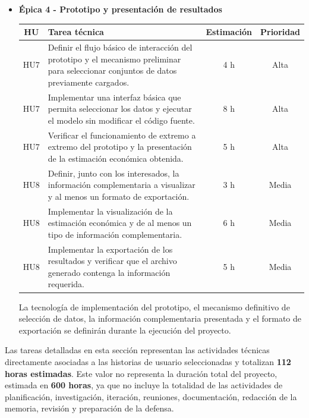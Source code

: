 \documentclass[
11pt, %
]{charter}
\begin{document}
\begin{itemize}
  Los algoritmos concretos, las métricas, la estrategia de validación y las técnicas utilizadas para analizar la relevancia de las variables se definirán y ajustarán durante la ejecución del proyecto en función de las características de los datos y del modelo desarrollado.


  \item \textbf{\'{E}pica 4 - Prototipo y presentación de resultados}

  \begin{center}
  \begin{tabular}{|c|p{9cm}|c|c|}
  \hline
  \textbf{HU} & \textbf{Tarea técnica} & \textbf{Estimación} & \textbf{Prioridad} \\
  \hline
  HU7 & Definir el flujo básico de interacción del prototipo y el mecanismo preliminar para seleccionar conjuntos de datos previamente cargados. & 4 h & Alta \\
  \hline
  HU7 & Implementar una interfaz básica que permita seleccionar los datos y ejecutar el modelo sin modificar el código fuente. & 8 h & Alta \\
  \hline
  HU7 & Verificar el funcionamiento de extremo a extremo del prototipo y la presentación de la estimación económica obtenida. & 5 h & Alta \\
  \hline
  HU8 & Definir, junto con los interesados, la información complementaria a visualizar y al menos un formato de exportación. & 3 h & Media \\
  \hline
  HU8 & Implementar la visualización de la estimación económica y de al menos un tipo de información complementaria. & 6 h & Media \\
  \hline
  HU8 & Implementar la exportación de los resultados y verificar que el archivo generado contenga la información requerida. & 5 h & Media \\
  \hline
  \end{tabular}
  \end{center}

  La tecnología de implementación del prototipo, el mecanismo definitivo de selección de datos, la información complementaria presentada y el formato de exportación se definirán durante la ejecución del proyecto.

\end{itemize}

Las tareas detalladas en esta sección representan las actividades técnicas directamente asociadas a las historias de usuario seleccionadas y totalizan \textbf{112 horas estimadas}. Este valor no representa la duración total del proyecto, estimada en \textbf{600 horas}, ya que no incluye la totalidad de las actividades de planificación, investigación, iteración, reuniones, documentación, redacción de la memoria, revisión y preparación de la defensa.
\end{document}
